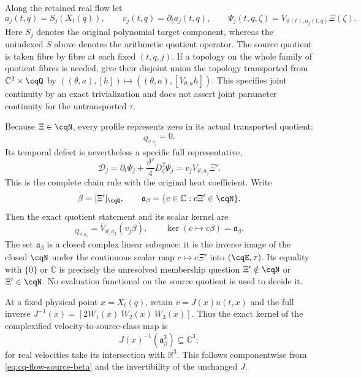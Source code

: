 Along the retained real flow let
\[
 a_j(t,q)=S_j(X_t(q)),\qquad
 v_j(t,q)=\partial_ta_j(t,q),\qquad
 \Psi_j(t,q,\zeta)=V_{\vartheta(t),a_j(t,q)}\Xi(\zeta).
\]
Here $S_j$ denotes the original polynomial target component, whereas
the unindexed $S$ above denotes the arithmetic quotient operator.
The source quotient is taken fibre by fibre at each fixed $(t,q,j)$.
If a topology on the whole family of quotient fibres is needed, give
their disjoint union the topology transported from
$\mathbb C^2\times\cqQ$ by
$((\theta,a),[h])\mapsto((\theta,a),[V_{\theta,a}h])$.
This specifies joint continuity by an exact trivialization and does
not assert joint parameter continuity for the untransported $\tau$.

Because $\Xi\in\cqN$, every profile represents zero in its actual
transported quotient:
\begin{equation}
 [\Psi_j]_{Q_{\vartheta,a_j}}=0.
 \label{eq:cq-flow-profile-zero}
\end{equation}
Its temporal defect is nevertheless a specific full representative,
\[
 \mathcal D_j=\partial_t\Psi_j+
              \frac{\vartheta'}4D_\zeta^2\Psi_j
             =v_jV_{\vartheta,a_j}\Xi'.
\]
This is the complete chain rule with the original heat coefficient.
Write
\[
 \beta=[\Xi']_{\cqQ},\qquad
 \mathfrak a_\beta=\{c\in\mathbb C:c\Xi'\in\cqN\}.
\]
Then the exact quotient statement and its scalar kernel are
\begin{equation}
 [\mathcal D_j]_{Q_{\vartheta,a_j}}
    =\overline V_{\vartheta,a_j}(v_j\beta),\qquad
 \ker(c\mapsto c\beta)=\mathfrak a_\beta .
 \label{eq:cq-flow-source-beta}
\end{equation}
The set $\mathfrak a_\beta$ is a closed complex linear subspace:
it is the inverse image of the closed $\cqN$ under the continuous
scalar map $c\mapsto c\Xi'$ into $(\cqE,\tau)$.
Its equality with $\{0\}$ or $\mathbb C$ is precisely the unresolved
membership question $\Xi'\notin\cqN$ or $\Xi'\in\cqN$.
No evaluation functional on the source quotient is used to decide it.

At a fixed physical point $x=X_t(q)$, retain
$v=J(x)u(t,x)$ and the full inverse
$J^{-1}(x)=[2W_1(x)\ W_2(x)\ W_3(x)]$. Thus the exact kernel of
the complexified velocity-to-source-class map is
\[
 J(x)^{-1}(\mathfrak a_\beta^3)\subseteq\mathbb C^3;
\]
for real velocities take its intersection with $\mathbb R^3$.
This follows componentwise from \eqref{eq:cq-flow-source-beta} and
the invertibility of the unchanged $J$.

